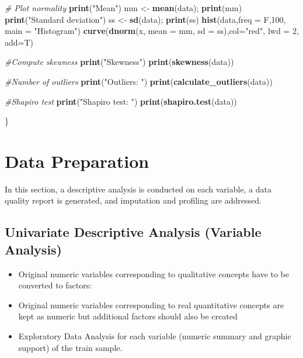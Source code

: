 \documentclass[
]{article}
\newenvironment{Shaded}{\begin{snugshade}}{\end{snugshade}}
\newcommand{\AttributeTok}[1]{\textcolor[rgb]{0.13,0.29,0.53}{#1}}
\newcommand{\CommentTok}[1]{\textcolor[rgb]{0.56,0.35,0.01}{\textit{#1}}}
\newcommand{\DecValTok}[1]{\textcolor[rgb]{0.00,0.00,0.81}{#1}}
\newcommand{\FunctionTok}[1]{\textcolor[rgb]{0.13,0.29,0.53}{\textbf{#1}}}
\newcommand{\NormalTok}[1]{#1}
\newcommand{\OtherTok}[1]{\textcolor[rgb]{0.56,0.35,0.01}{#1}}
\newcommand{\StringTok}[1]{\textcolor[rgb]{0.31,0.60,0.02}{#1}}
\providecommand{\tightlist}{%
  \setlength{\itemsep}{0pt}\setlength{\parskip}{0pt}}
\begin{document}
\begin{Shaded}
\begin{Highlighting}[]
  \CommentTok{\# Plot normality }
  \FunctionTok{print}\NormalTok{(}\StringTok{"Mean"}\NormalTok{)}
\NormalTok{  mm }\OtherTok{\textless{}{-}} \FunctionTok{mean}\NormalTok{(data); }\FunctionTok{print}\NormalTok{(mm)}
  \FunctionTok{print}\NormalTok{(}\StringTok{"Standard deviation"}\NormalTok{)}
\NormalTok{  ss }\OtherTok{\textless{}{-}} \FunctionTok{sd}\NormalTok{(data); }\FunctionTok{print}\NormalTok{(ss)}
  \FunctionTok{hist}\NormalTok{(data,}\AttributeTok{freq =}\NormalTok{ F,}\DecValTok{100}\NormalTok{, }\AttributeTok{main =} \StringTok{"Histogram"}\NormalTok{)}
  \FunctionTok{curve}\NormalTok{(}\FunctionTok{dnorm}\NormalTok{(x, }\AttributeTok{mean =}\NormalTok{ mm, }\AttributeTok{sd =}\NormalTok{ ss),}\AttributeTok{col=}\StringTok{"red"}\NormalTok{, }\AttributeTok{lwd =} \DecValTok{2}\NormalTok{, }\AttributeTok{add=}\NormalTok{T)}
  
  \CommentTok{\#Compute skewness}
  \FunctionTok{print}\NormalTok{(}\StringTok{"Skewness"}\NormalTok{)}
  \FunctionTok{print}\NormalTok{(}\FunctionTok{skewness}\NormalTok{(data))}
  
  \CommentTok{\#Number of outliers}
  \FunctionTok{print}\NormalTok{(}\StringTok{"Outliers: "}\NormalTok{)}
  \FunctionTok{print}\NormalTok{(}\FunctionTok{calculate\_outliers}\NormalTok{(data))}
  
  \CommentTok{\#Shapiro test}
  \FunctionTok{print}\NormalTok{(}\StringTok{"Shapiro test: "}\NormalTok{)}
  \FunctionTok{print}\NormalTok{(}\FunctionTok{shapiro.test}\NormalTok{(data))}

\NormalTok{\}}
\end{Highlighting}
\end{Shaded}

\newpage

\section{Data Preparation}\label{data-preparation}

In this section, a descriptive analysis is conducted on each variable, a
data quality report is generated, and imputation and profiling are
addressed.

\subsection{Univariate Descriptive Analysis (Variable
Analysis)}\label{univariate-descriptive-analysis-variable-analysis}

\begin{itemize}
\tightlist
\item
  Original numeric variables corresponding to qualitative concepts have
  to be converted to factors:
\item
  Original numeric variables corresponding to real quantitative concepts
  are kept as numeric but additional factors should also be created
\item
  Exploratory Data Analysis for each variable (numeric summary and
  graphic support) of the train sample.
\end{itemize}
\end{document}

